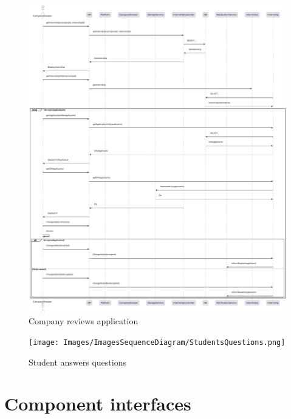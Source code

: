 \newpage

\begin{figure}[ht!]
    \centering
    \includegraphics[scale=0.25]{Images/ImagesSequenceDiagram/CompanyReviewApplication.png}
    \caption{Company reviews application}
\end{figure}

\newpage

\begin{figure}[ht!]
    \centering
    \texttt{[image: Images/ImagesSequenceDiagram/StudentsQuestions.png]}
    \caption{Student answers questions}
\end{figure}

\newpage




\section{Component interfaces}

